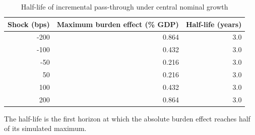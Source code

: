\begin{table}[H]
\centering
\caption{Half-life of incremental pass-through under central nominal growth}
\label{tab:repricing-half-life}
\begin{tabular}{rrr}
\toprule
Shock (bps) & Maximum burden effect (\% GDP) & Half-life (years) \\
\midrule
-200 & 0.864 & 3.0 \\
-100 & 0.432 & 3.0 \\
-50 & 0.216 & 3.0 \\
50 & 0.216 & 3.0 \\
100 & 0.432 & 3.0 \\
200 & 0.864 & 3.0 \\
\bottomrule
\end{tabular}
\par\smallskip
\parbox{0.92\textwidth}{\small The half-life is the first horizon at which the absolute burden effect reaches half of its simulated maximum.}
\end{table}
